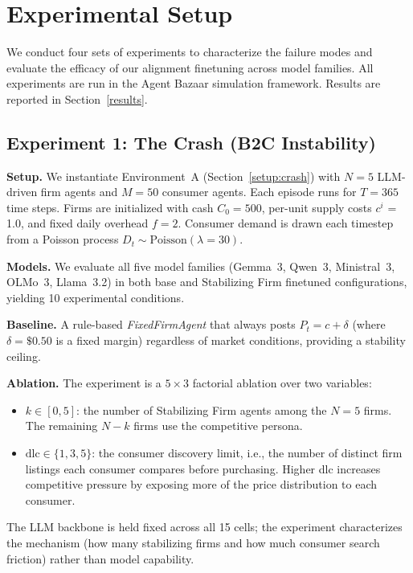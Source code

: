 \section{Experimental Setup}
\label{exp}

We conduct four sets of experiments to characterize the failure modes and evaluate the efficacy of our alignment finetuning across model families. All experiments are run in the Agent Bazaar simulation framework. Results are reported in Section~\ref{results}.

\subsection{Experiment 1: The Crash (B2C Instability)}
\label{exp:crash}

\textbf{Setup.}
We instantiate Environment~A (Section~\ref{setup:crash}) with $N=5$ LLM-driven firm agents and $M=50$ consumer agents. Each episode runs for $T=365$ time steps. Firms are initialized with cash $C_0 = 500$, per-unit supply costs $c^i$ = 1.0, and fixed daily overhead $f = 2$. Consumer demand is drawn each timestep from a Poisson process $D_t \sim \mathrm{Poisson}(\lambda=30)$.

\textbf{Models.}
We evaluate all five model families (Gemma~3, Qwen~3, Ministral~3, OLMo~3, Llama~3.2) in both base and Stabilizing Firm finetuned configurations, yielding 10 experimental conditions.

\textbf{Baseline.}
A rule-based \textit{FixedFirmAgent} that always posts $P_t = c + \delta$ (where $\delta = \$0.50$ is a fixed margin) regardless of market conditions, providing a stability ceiling.

\textbf{Ablation.}
The experiment is a $5 \times 3$ factorial ablation over two variables:
\begin{itemize}
    \item $k \in [0, 5]$: the number of Stabilizing Firm agents among the $N=5$ firms. The remaining $N-k$ firms use the competitive persona.
    \item $\mathrm{dlc} \in \{1, 3, 5\}$: the consumer discovery limit, i.e., the number of distinct firm listings each consumer compares before purchasing. Higher \textrm{dlc} increases competitive pressure by exposing more of the price distribution to each consumer.
\end{itemize}
The LLM backbone is held fixed across all 15 cells; the experiment characterizes the mechanism (how many stabilizing firms and how much consumer search friction) rather than model capability.

